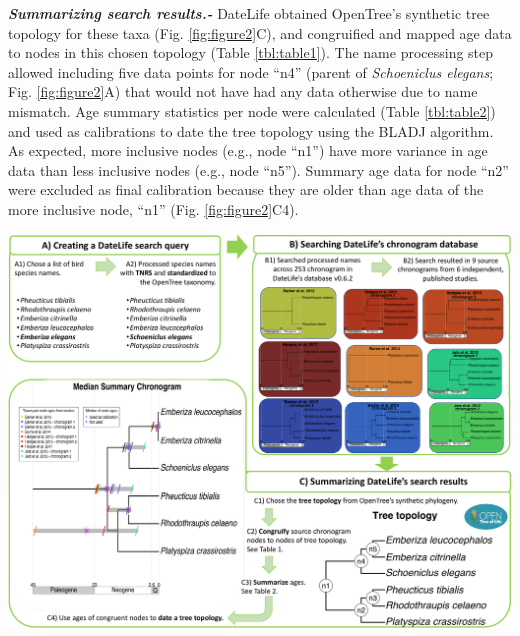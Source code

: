 \documentclass[
  man]{apa6}
\begin{document}
\vspace{5mm}

\emph{\textbf{Summarizing search results.-}}
DateLife obtained OpenTree's synthetic tree topology for these taxa (Fig. \ref{fig:figure2}C), and congruified and mapped age data to nodes in this chosen topology (Table \ref{tbl:table1}).
The name processing step allowed including five data points for node ``n4'' (parent of \emph{Schoeniclus elegans}; Fig. \ref{fig:figure2}A) that would not have had any data otherwise due to name mismatch.
Age summary statistics per node were calculated (Table \ref{tbl:table2}) and used as calibrations to date the tree topology using the BLADJ algorithm.
As expected, more inclusive nodes (e.g., node ``n1'') have more variance in age data than less inclusive nodes (e.g., node ``n5'').
Summary age data for node ``n2'' were excluded as final calibration because they are older than age data of the more inclusive node, ``n1'' (Fig. \ref{fig:figure2}C4).

\vspace{10mm}

\begin{center}
\includegraphics[width = 6.5in]{../figures/figure2/figure2.pdf}
\end{center}
\end{document}

